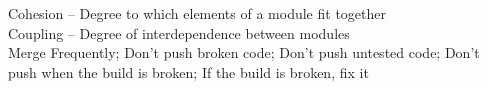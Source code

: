 \documentclass[number]{assignment}
\begin{document}
\begin{landscape}
\headfoot
\begin{multicols}{3}


\small Cohesion -- Degree to which elements of a module fit together\\
\small Coupling -- Degree of interdependence between modules\\

\small Merge Frequently; Don't push broken code; Don't push untested code; Don't push when the build is broken; If the build is broken, fix it\\


\end{multicols}
\end{landscape}
\end{document}
